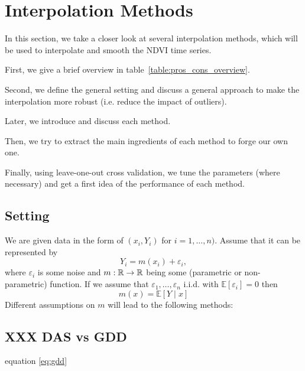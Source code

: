 \newcommand{\RobItPlot}{fitted to different (SCL45) NDVI time series. Iterations of a robustifing refit (as indicated in section~\ref{sec:loess_robustify}) are also displayed}


\chapter{Interpolation Methods}
\label{sec:itpl}

In this section, we take a closer look at several interpolation methods, which will be used to interpolate and smooth the NDVI time series.

First, we give a brief overview in table~\ref{table:pros_cons_overview}.

Second, we define the general setting and discuss a general approach to make the interpolation more robust (i.e. reduce the impact of outliers).

Later, we introduce and discuss each method.

Then, we try to extract the main ingredients of each method to forge our own one.

Finally, using leave-one-out cross validation, we tune the parameters (where necessary) and get a first idea of the performance of each method.


\footnotesize

\normalsize


\section{Setting}
We are given data in the form of $\left(x_{i}, Y_{i}\right)$ for $i=1, \ldots, n)$. Assume that it can be represented by
$$
	Y_{i}=m\left(x_{i}\right)+\varepsilon_{i},
$$
where $\varepsilon_i$ is some noise and $m: \mathbb{R} \rightarrow \mathbb{R}$ being some (parametric or non-parametric) function. If we assume that $\varepsilon_{1}, \ldots, \varepsilon_{n}$ i.i.d. with $\mathbb{E}\left[\varepsilon_{i}\right]=0$ then $$m(x)=\mathbb{E}[Y \mid x]$$
Different assumptions on $m$ will lead to the following methods:

\section{XXX DAS vs GDD}
equation \ref{eq:gdd}


